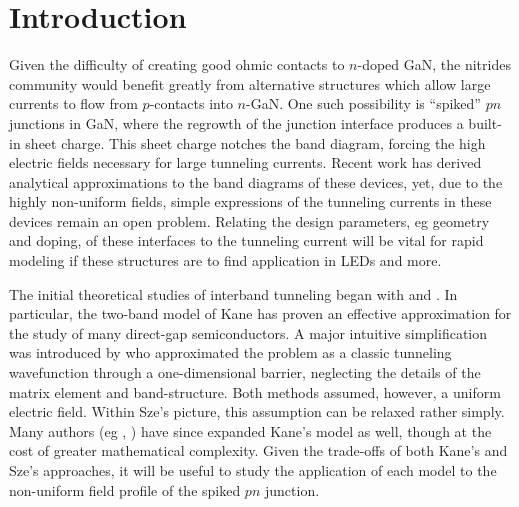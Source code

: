 \section{Introduction}
Given the difficulty of creating good ohmic contacts to $n$-doped GaN, the nitrides community would benefit greatly from alternative structures which allow large currents to flow from $p$-contacts into $n$-GaN.  One such possibility is ``spiked'' $pn$ junctions in GaN, where the regrowth of the junction interface produces a built-in sheet charge.  This sheet charge notches the band diagram, forcing the high electric fields necessary for large tunneling currents.  Recent work has derived analytical approximations to the band diagrams of these devices, yet, due to the highly non-uniform fields, simple expressions of the tunneling currents in these devices remain an open problem.  Relating the design parameters, eg geometry and doping, of these interfaces to the tunneling current will be vital for rapid modeling if these structures are to find application in LEDs and more.

The initial theoretical studies of interband tunneling began with \cite{Keldysh_1958} and \cite{Kane_1960}.  In particular, the two-band model of Kane has proven an effective approximation for the study of many direct-gap semiconductors.  A major intuitive simplification was introduced by \cite{Sze_2nd} who approximated the problem as a classic tunneling wavefunction through a one-dimensional barrier, neglecting the details of the matrix element and band-structure.  Both methods assumed, however, a uniform electric field. Within Sze's picture, this assumption can be relaxed rather simply.  Many authors (eg \cite{Takayanagi_1991}, \cite{Tanaka_1994}) have since expanded Kane's model as well, though at the cost of greater mathematical complexity.  Given the trade-offs of both Kane's and Sze's approaches, it will be useful to study the application of each model to the non-uniform field profile of the spiked $pn$ junction.

